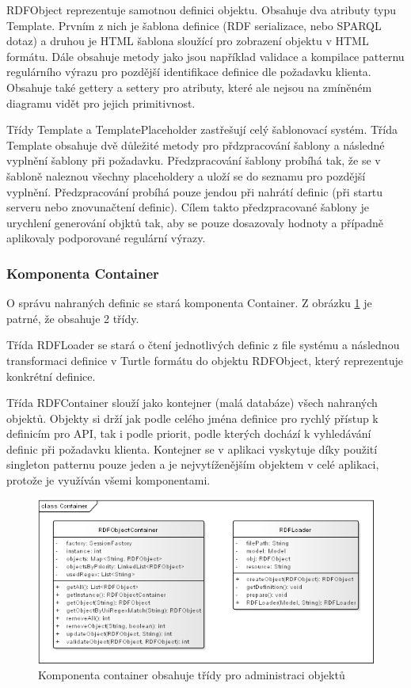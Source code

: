 \documentclass[thesis=B,czech]{FITthesis}[2012/06/26]
\begin{document}
    RDFObject reprezentuje samotnou definici objektu. Obsahuje dva atributy typu Template. Prvním z nich je šablona definice (RDF serializace, nebo SPARQL dotaz) a
    druhou je HTML šablona sloužící pro zobrazení objektu v HTML formátu. Dále obsahuje metody jako jsou například validace a kompilace patternu
    regulárního výrazu pro pozdější identifikace definice dle požadavku klienta. Obsahuje také gettery a settery pro atributy, které ale nejsou
    na zmíněném diagramu vidět pro jejich primitivnost.
    
    Třídy Template a TemplatePlaceholder zastřešují celý šablonovací systém. Třída Template obsahuje dvě důležité metody pro přdzpracování šablony
    a následné vyplnění šablony při požadavku. Předzpracování šablony probíhá tak, že se v šabloně naleznou všechny placeholdery a uloží se do seznamu
    pro pozdější vyplnění. Předzpracování probíhá pouze jendou při nahrátí definic (při startu serveru nebo znovunačtení definic). Cílem takto
    předzpracované šablony je urychlení generování objktů tak, aby se pouze dosazovaly hodnoty a případně aplikovaly podporované regulární výrazy.
 
 \subsubsection{Komponenta Container}
 O správu nahraných definic se stará komponenta Container. Z obrázku \ref{container_class} je patrné, že obsahuje 2 třídy.
 
 Třída RDFLoader se stará
 o čtení jednotlivých definic z file systému a následnou transformaci definice v Turtle formátu do objektu RDFObject,
 který reprezentuje konkrétní definice.
 
 Třída RDFContainer slouží jako kontejner (malá databáze) všech nahraných objektů. Objekty si drží jak podle celého jména definice pro rychlý přístup
 k definicím pro API, tak i podle priorit, podle kterých dochází k vyhledávání definic při požadavku klienta.
 Kontejner se v aplikaci vyskytuje díky použití singleton patternu
 pouze jeden a je nejvytíženějším objektem v celé aplikaci, protože je využíván všemi komponentami.
 
 \begin{figure}\centering
 	\includegraphics[width=\textwidth]{container_class}
 	\caption[Model tříd]{Komponenta container obsahuje třídy pro administraci objektů}\label{container_class}
    \end{figure}
    
\end{document}
